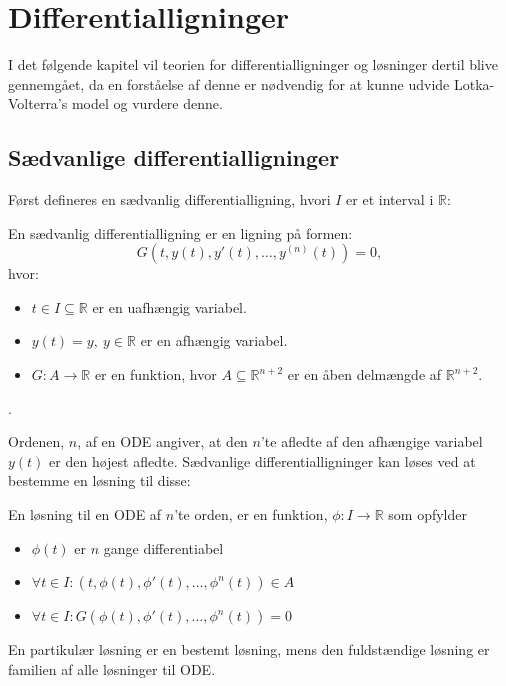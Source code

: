 \chapter{Differentialligninger}
I det følgende kapitel vil teorien for differentialligninger og løsninger dertil blive gennemgået, da en forståelse af denne er nødvendig for at kunne udvide Lotka-Volterra's model og vurdere denne. 

\section{Sædvanlige differentialligninger}
Først defineres en sædvanlig differentialligning, hvori $I$ er et interval i $\mathbb{R}$:
\begin{definition}
En sædvanlig differentialligning er en ligning på formen: \hfill \break
$$G(t,y(t),y'(t), \hdots , y^{(n)}(t))=0,$$
hvor:
\begin{itemize}
    \item $t \in I \subseteq \mathbb{R}$ er en uafhængig variabel.
    \item $y(t) = y, \ y \in \mathbb{R}$ er en afhængig variabel.
    \item $G:A \to \mathbb{R}$ er en funktion, hvor $A \subseteq \mathbb{R}^{n+2}$ er en åben delmængde af $\mathbb{R}^{n+2}$.
\end{itemize}.
\end{definition}

Ordenen, $n$, af en ODE angiver, at den $n$'te afledte af den afhængige variabel $y(t)$ er den højest afledte. 
Sædvanlige differentialligninger kan løses ved at bestemme en løsning til disse:

\begin{definition} 
En løsning til en ODE af $n$'te orden, er en funktion, $\phi: I\to \mathbb{R}$ som opfylder
\begin{itemize}
    \item $\phi(t)$ er $n$ gange differentiabel
    \item $\forall t\in I: (t,\phi(t),\phi'(t),\hdots,\phi^n(t))\in A$
    \item $\forall t\in I: G(\phi(t),\phi'(t),\hdots,\phi^n(t))=0$
\end{itemize}

En partikulær løsning er en bestemt løsning, mens den fuldstændige løsning er familien af alle løsninger til ODE.
\end{definition}

